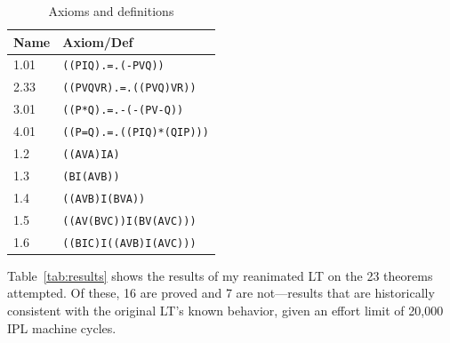 \documentclass[journal]{IEEEtran}
\begin{document}
\begin{table}[h]
\centering
\caption{Axioms and definitions}
\label{tab:axioms}
\begin{tabular}{ll}
\toprule
\textbf{Name} & \textbf{Axiom/Def}\\
\midrule
1.01  & \texttt{((PIQ).=.(-PVQ))}\\
2.33  & \texttt{((PVQVR).=.((PVQ)VR))}\\
3.01  & \texttt{((P*Q).=.-(-(PV-Q))}\\
4.01  & \texttt{((P=Q).=.((PIQ)*(QIP)))}\\
1.2   & \texttt{((AVA)IA)}\\
1.3   & \texttt{(BI(AVB))}\\
1.4   & \texttt{((AVB)I(BVA))}\\
1.5   & \texttt{((AV(BVC))I(BV(AVC)))}\\
1.6   & \texttt{((BIC)I((AVB)I(AVC)))}\\
\bottomrule
\end{tabular}
\end{table}

Table~\ref{tab:results} shows the results of my reanimated LT on the
23 theorems attempted. Of these, 16 are proved and 7 are not---results
that are historically consistent with the original LT's known
behavior, given an effort limit of 20,000 IPL machine cycles.
\end{document}
